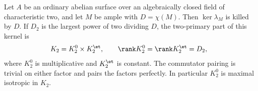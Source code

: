\begin{lemma}
\label{lem:DE-A3-ordinary-polarization-kernel}
Let $A$ be an ordinary abelian surface over an algebraically closed
field of characteristic two, and let $M$ be ample with $D=\chi(M)$.
Then $\ker\lambda_M$ is killed by $D$.  If $D_2$ is the largest
power of two dividing $D$, the two-primary part of this kernel is
\[
             K_2=K_2^0\times K_2^{\et},
             \qquad \rank K_2^0=\rank K_2^{\et}=D_2,
\]
where $K_2^0$ is multiplicative and $K_2^{\et}$ is constant.
The commutator pairing is trivial on either factor and pairs the
factors perfectly.  In particular $K_2^0$ is maximal isotropic
in $K_2$.
\end{lemma}
